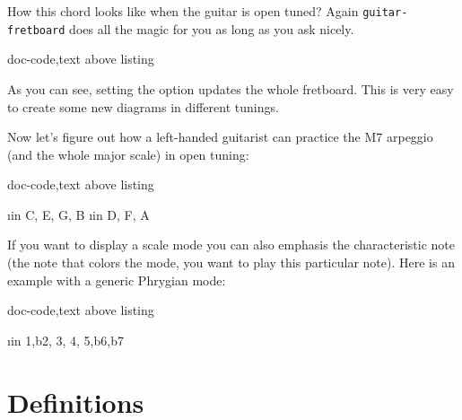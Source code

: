 \documentclass[a4paper]{article}
\newcommand{\pkg}[1]{\texttt{#1}}
\begin{document}
How this \pC chord looks like when the guitar is open \pG tuned? Again
\pkg{guitar-fretboard} does all the magic for you as long as you ask nicely.

\begin{tcblisting}{doc-code,text above listing}
  \begin{fretboard}[frets min = 0, frets max = 3,
      chord, tuning = \FBtuning{guitar/open g},
      title = {\pC Chord (open \pG)},
      fret numbers, scale=0.35]
      
  \end{fretboard}
\end{tcblisting}

As you can see, setting the  option updates the whole
fretboard. This is very easy to create some new diagrams in different
tunings.

Now let's figure out how a left-handed guitarist can practice the \pC\unskip{}M7
arpeggio (and the whole major scale) in open \pG tuning:

\begin{tcblisting}{doc-code,text above listing}
  \begin{fretboard}[frets before = 2, frets after = 2,
      tuning = \FBtuning{guitar/open g}, left handed,
      title = {\pC\unskip{}M7 arpeggio in open \pG tuning},
      fret numbers, scale=0.35]
    \foreach \i in {C, E, G, B} {
      \FBnote{\i}
    }
    \foreach \i in {D, F, A} {
      \FBnote[shade]{\i}
    }
  \end{fretboard}
\end{tcblisting}


If you want to display a scale mode you can also emphasis the characteristic
note (the note that colors the mode, you want to play this particular
note). Here is an example with a generic Phrygian mode:

\begin{tcblisting}{doc-code,text above listing}
  \begin{fretboard}[frets min=2, frets max=6,
      transpose = -5,
      title = {Phrygian scale}, scale=0.35]
    \foreach \i in {1,b2, 3, 4, 5,b6,b7} {
      \FBnote{\i}
    }
  \end{fretboard}
\end{tcblisting}

\fi


\section{Definitions}
\end{document}
